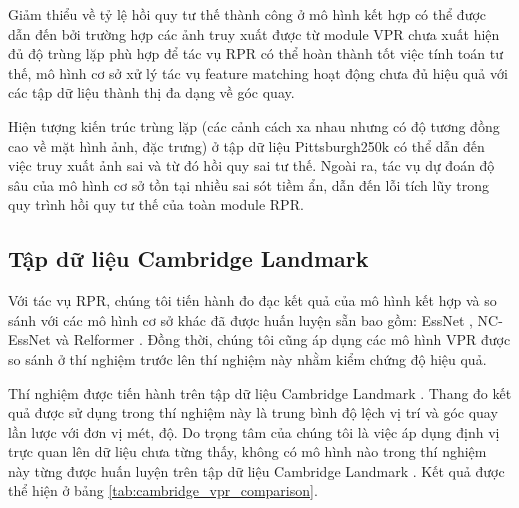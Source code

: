 Giảm thiểu về tỷ lệ hồi quy tư thế thành công ở mô hình kết hợp có thể được dẫn đến bởi trường hợp các ảnh truy xuất được từ module VPR chưa xuất hiện đủ độ trùng lặp phù hợp để tác vụ RPR có thể hoàn thành tốt việc tính toán tư thế, mô hình cơ sở xử lý tác vụ feature matching hoạt động chưa đủ hiệu quả với các tập dữ liệu thành thị đa dạng về góc quay.

Hiện tượng kiến trúc trùng lặp (các cảnh cách xa nhau nhưng có độ tương đồng cao về mặt hình ảnh, đặc trưng) ở tập dữ liệu Pittsburgh250k \cite{6618963} có thể dẫn đến việc truy xuất ảnh sai và từ đó hồi quy sai tư thế. Ngoài ra, tác vụ dự đoán độ sâu của mô hình cơ sở tồn tại nhiều sai sót tiềm ẩn, dẫn đến lỗi tích lũy trong quy trình hồi quy tư thế của toàn module RPR.

\subsection*{Tập dữ liệu Cambridge Landmark}

Với tác vụ RPR, chúng tôi tiến hành đo đạc kết quả của mô hình kết hợp và so sánh với các mô hình cơ sở khác đã được huấn luyện sẵn bao gồm: EssNet \cite{zhou2020learn}, NC-EssNet \cite{zhou2020learn} và Relformer \cite{idan2023learning}. Đồng thời, chúng tôi cũng áp dụng các mô hình VPR được so sánh ở thí nghiệm trước lên thí nghiệm này nhằm kiểm chứng độ hiệu quả.

Thí nghiệm được tiến hành trên tập dữ liệu Cambridge Landmark \cite{kendall2016posenet}. Thang đo kết quả được sử dụng trong thí nghiệm này là trung bình độ lệch vị trí và góc quay lần lược với đơn vị mét, độ. Do trọng tâm của chúng tôi là việc áp dụng định vị trực quan lên dữ liệu chưa từng thấy, không có mô hình nào trong thí nghiệm này từng được huấn luyện trên tập dữ liệu Cambridge Landmark \cite{kendall2016posenet}. Kết quả được thể hiện ở bảng \ref{tab:cambridge_vpr_comparison}.

